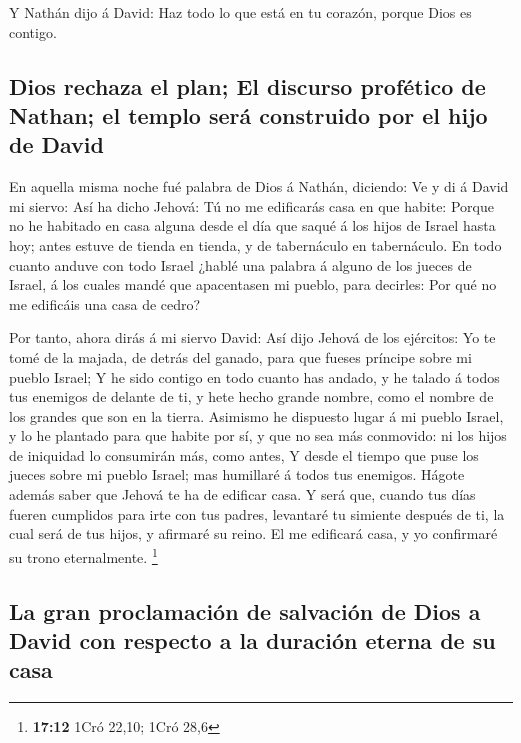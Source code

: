  Y Nathán dijo á David: Haz todo lo que está en tu corazón,
porque Dios es contigo.

\hypertarget{dios-rechaza-el-plan-el-discurso-profuxe9tico-de-nathan-el-templo-seruxe1-construido-por-el-hijo-de-david}{%
\subsection{Dios rechaza el plan; El discurso profético de Nathan; el
templo será construido por el hijo de
David}\label{dios-rechaza-el-plan-el-discurso-profuxe9tico-de-nathan-el-templo-seruxe1-construido-por-el-hijo-de-david}}

 En aquella misma noche fué palabra de Dios á Nathán,
diciendo:  Ve y di á David mi siervo: Así ha dicho Jehová:
Tú no me edificarás casa en que habite:  Porque no he
habitado en casa alguna desde el día que saqué á los hijos de Israel
hasta hoy; antes estuve de tienda en tienda, y de tabernáculo en
tabernáculo.  En todo cuanto anduve con todo Israel ¿hablé
una palabra á alguno de los jueces de Israel, á los cuales mandé que
apacentasen mi pueblo, para decirles: Por qué no me edificáis una casa
de cedro?

 Por tanto, ahora dirás á mi siervo David: Así dijo Jehová
de los ejércitos: Yo te tomé de la majada, de detrás del ganado, para
que fueses príncipe sobre mi pueblo Israel;  Y he sido
contigo en todo cuanto has andado, y he talado á todos tus enemigos de
delante de ti, y hete hecho grande nombre, como el nombre de los grandes
que son en la tierra.  Asimismo he dispuesto lugar á mi
pueblo Israel, y lo he plantado para que habite por sí, y que no sea más
conmovido: ni los hijos de iniquidad lo consumirán más, como antes,
 Y desde el tiempo que puse los jueces sobre mi pueblo
Israel; mas humillaré á todos tus enemigos. Hágote además saber que
Jehová te ha de edificar casa.  Y será que, cuando tus días
fueren cumplidos para irte con tus padres, levantaré tu simiente después
de ti, la cual será de tus hijos, y afirmaré su reino.  El
me edificará casa, y yo confirmaré su trono eternalmente. \footnote{\textbf{17:12}
  1Cró 22,10; 1Cró 28,6}

\hypertarget{la-gran-proclamaciuxf3n-de-salvaciuxf3n-de-dios-a-david-con-respecto-a-la-duraciuxf3n-eterna-de-su-casa}{%
\subsection{La gran proclamación de salvación de Dios a David con
respecto a la duración eterna de su
casa}\label{la-gran-proclamaciuxf3n-de-salvaciuxf3n-de-dios-a-david-con-respecto-a-la-duraciuxf3n-eterna-de-su-casa}}

